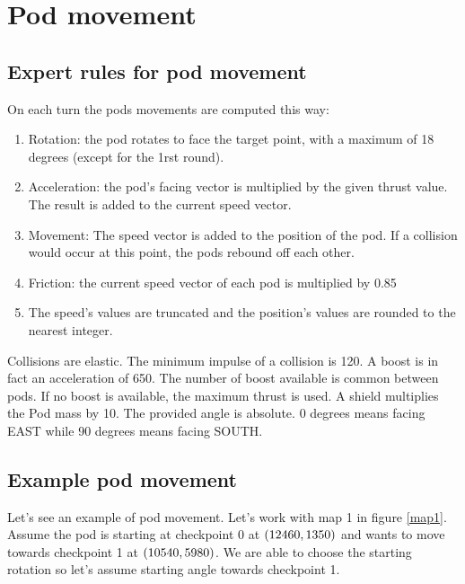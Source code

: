 \documentclass[main.tex]{subfiles}
\begin{document}
\section{Pod movement}

\subsection{Expert rules for pod movement}

On each turn the pods movements are computed this way:
\begin{enumerate}
\item Rotation: the pod rotates to face the target point, with a maximum of 18 degrees (except for the 1rst round).
\item Acceleration: the pod's facing vector is multiplied by the given thrust value. The result is added to the current speed vector.
\item Movement: The speed vector is added to the position of the pod. If a collision would occur at this point, the pods rebound off each other.
\item Friction: the current speed vector of each pod is multiplied by 0.85
\item The speed's values are truncated and the position's values are rounded to the nearest integer.
\end{enumerate}

\par
Collisions are elastic. The minimum impulse of a collision is 120.
A boost is in fact an acceleration of 650. The number of boost available is common between pods.
If no boost is available, the maximum thrust is used.
A shield multiplies the Pod mass by 10.
The provided angle is absolute. 0 degrees means facing EAST while 90 degrees means facing SOUTH.

\newcommand{\cpx}[1]{\checkpoints[0][#1][0]}
\newcommand{\cpy}[1]{\checkpoints[0][#1][1]}

\subsection{Example pod movement}

\par
Let's see an example of pod movement. Let's work with map 1 in figure \ref{map1}. Assume the pod is starting at checkpoint 0 at
$(\print{\cpx{0}}, \print{\cpy{0}})$ and wants to move towards checkpoint 1 at
$(\print{\cpx{1}}, \print{\cpy{1}})$.
We are able to choose the starting rotation so let's assume starting angle towards checkpoint 1.
\end{document}
